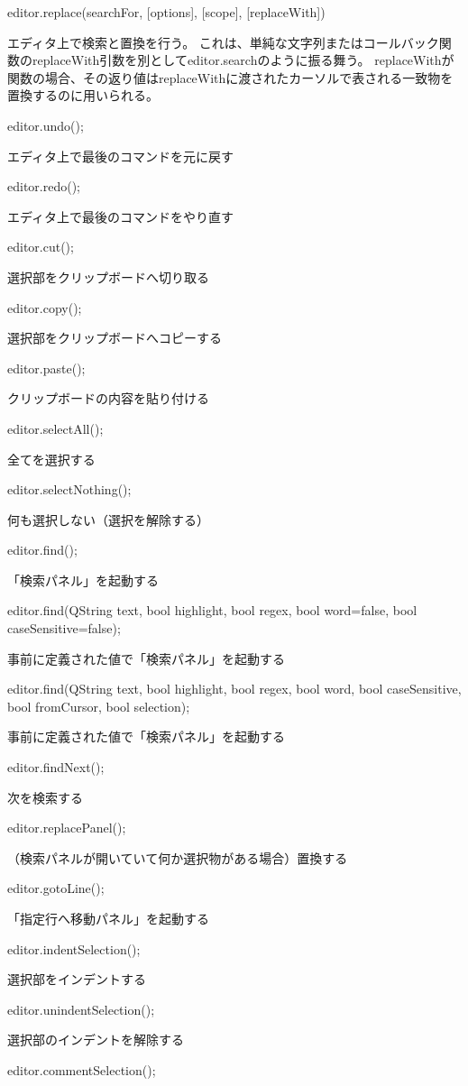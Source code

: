 \documentclass[]{book}
\begin{document}
editor.replace(searchFor, {[}options{]}, {[}scope{]}, {[}replaceWith{]})

エディタ上で検索と置換を行う。
これは、単純な文字列またはコールバック関数のreplaceWith引数を別としてeditor.searchのように振る舞う。
replaceWithが関数の場合、その返り値はreplaceWithに渡されたカーソルで表される一致物を置換するのに用いられる。

editor.undo();

エディタ上で最後のコマンドを元に戻す

editor.redo();

エディタ上で最後のコマンドをやり直す

editor.cut();

選択部をクリップボードへ切り取る

editor.copy();

選択部をクリップボードへコピーする

editor.paste();

クリップボードの内容を貼り付ける

editor.selectAll();

全てを選択する

editor.selectNothing();

何も選択しない（選択を解除する）

editor.find();

「検索パネル」を起動する

editor.find(QString text, bool highlight, bool regex, bool word=false,
bool caseSensitive=false);

事前に定義された値で「検索パネル」を起動する

editor.find(QString text, bool highlight, bool regex, bool word, bool
caseSensitive, bool fromCursor, bool selection);

事前に定義された値で「検索パネル」を起動する

editor.findNext();

次を検索する

editor.replacePanel();

（検索パネルが開いていて何か選択物がある場合）置換する

editor.gotoLine();

「指定行へ移動パネル」を起動する

editor.indentSelection();

選択部をインデントする

editor.unindentSelection();

選択部のインデントを解除する

editor.commentSelection();
\end{document}
